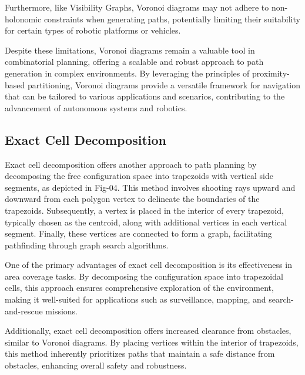\vspace*{6mm}


Furthermore, like Visibility Graphs, Voronoi diagrams may not adhere to non-holonomic constraints when generating paths, potentially limiting their suitability for certain types of robotic platforms or vehicles.

\vspace*{6mm}


Despite these limitations, Voronoi diagrams remain a valuable tool in combinatorial planning, offering a scalable and robust approach to path generation in complex environments. By leveraging the principles of proximity-based partitioning, Voronoi diagrams provide a versatile framework for navigation that can be tailored to various applications and scenarios, contributing to the advancement of autonomous systems and robotics.



\subsection{Exact Cell Decomposition}


Exact cell decomposition offers another approach to path planning by decomposing the free configuration space into trapezoids with vertical side segments, as depicted in Fig-04. This method involves shooting rays upward and downward from each polygon vertex to delineate the boundaries of the trapezoids. Subsequently, a vertex is placed in the interior of every trapezoid, typically chosen as the centroid, along with additional vertices in each vertical segment. Finally, these vertices are connected to form a graph, facilitating pathfinding through graph search algorithms.

\vspace*{6mm}


One of the primary advantages of exact cell decomposition is its effectiveness in area coverage tasks. By decomposing the configuration space into trapezoidal cells, this approach ensures comprehensive exploration of the environment, making it well-suited for applications such as surveillance, mapping, and search-and-rescue missions.

\vspace*{6mm}


Additionally, exact cell decomposition offers increased clearance from obstacles, similar to Voronoi diagrams. By placing vertices within the interior of trapezoids, this method inherently prioritizes paths that maintain a safe distance from obstacles, enhancing overall safety and robustness.

